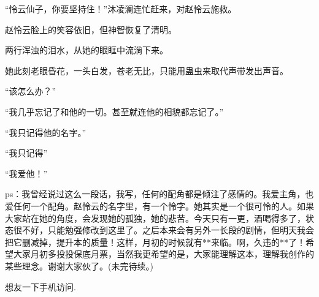 \begin{this_body}
“怜云仙子，你要坚持住！”沐凌澜连忙赶来，对赵怜云施救。

赵怜云脸上的笑容依旧，但神智恢复了清明。

两行浑浊的泪水，从她的眼眶中流淌下来。

她此刻老眼昏花，一头白发，苍老无比，只能用蛊虫来取代声带发出声音。

“该怎么办？”

“我几乎忘记了和他的一切。甚至就连他的相貌都忘记了。”

“我只记得他的名字。”

“我只记得”

“我爱他！”

ps：我曾经说过这么一段话，我写，任何的配角都是倾注了感情的。我爱主角，也爱任何一个配角。赵怜云的名字里，有一个怜字。她其实是一个很可怜的人。如果大家站在她的角度，会发现她的孤独，她的悲苦。今天只有一更，酒喝得多了，状态很不好，只能勉强修改到这里了。之后本来会有另外一长段的剧情，但明天我会把它删减掉，提升本的质量！这样，月初的时候就有**来临。啊，久违的**了！希望大家月初多投投保底月票，当然我更希望的是，大家能理解这本，理解我创作的某些理念。谢谢大家伙了。(未完待续。)

想友一下手机访问.

\end{this_body}

